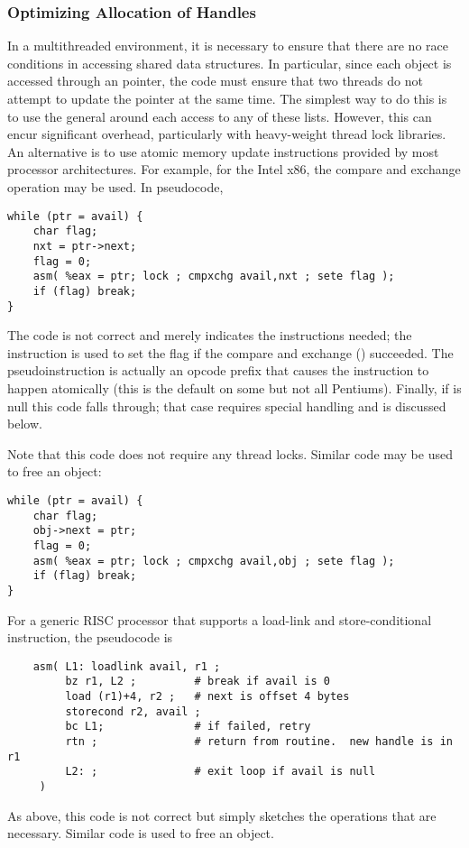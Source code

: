 \documentclass{article}
\begin{document}
\subsubsection{Optimizing Allocation of Handles}
In a multithreaded environment, it is necessary to ensure that there are no
race conditions in accessing shared data structures.  In particular, since
each object is accessed through an  pointer, the code must ensure
that two threads do not attempt to update the  pointer at the same
time.  The simplest way to do this is to use the general
 around each access to any of these
lists.  However, this can encur significant overhead, particularly with
heavy-weight thread lock libraries.  An alternative is to use atomic memory
update instructions provided by most processor architectures.  For example,
for the Intel x86, the compare and exchange operation may be used.  In
pseudocode, 
\begin{verbatim}
while (ptr = avail) {
    char flag;
    nxt = ptr->next; 
    flag = 0;
    asm( %eax = ptr; lock ; cmpxchg avail,nxt ; sete flag );
    if (flag) break;
}
\end{verbatim}
The  code is not correct and merely indicates the instructions
needed; the  instruction is used to set the flag if the compare and
exchange () succeeded.  The pseudoinstruction  is
actually an opcode prefix that causes the  instruction to happen
atomically (this is the default on some but not all Pentiums).  Finally,
if  is null this code falls through; that case requires special
handling and is discussed below.

Note that this code does not require any thread locks.  Similar code may be
used to free an object:
\begin{verbatim}
while (ptr = avail) {
    char flag;
    obj->next = ptr;
    flag = 0;
    asm( %eax = ptr; lock ; cmpxchg avail,obj ; sete flag );
    if (flag) break;
}
\end{verbatim}

For a generic RISC processor that supports a load-link and store-conditional
instruction, the pseudocode is
\begin{verbatim}
    asm( L1: loadlink avail, r1 ;
         bz r1, L2 ;         # break if avail is 0
         load (r1)+4, r2 ;   # next is offset 4 bytes
         storecond r2, avail ;
         bc L1;              # if failed, retry
         rtn ;               # return from routine.  new handle is in r1
         L2: ;               # exit loop if avail is null
     )
\end{verbatim}
As above, this  code is not correct but simply sketches the
operations that are necessary.  Similar code is used to free an object.
\end{document}
